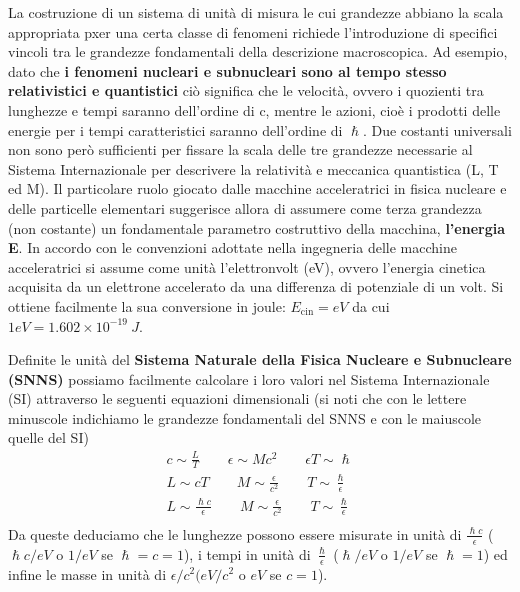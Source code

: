 La costruzione di un sistema di unità di misura le cui grandezze abbiano la scala appropriata pxer una certa classe di
fenomeni richiede l'introduzione di specifici vincoli tra le grandezze fondamentali della descrizione macroscopica.
Ad esempio, dato che \textbf{i fenomeni nucleari e subnucleari sono al tempo stesso relativistici e quantistici} ciò
significa che le velocità, ovvero i quozienti tra lunghezze e tempi saranno dell'ordine di c, mentre le azioni, cioè i
prodotti delle energie per i tempi caratteristici saranno dell'ordine di $\hslash$.
Due costanti universali non sono però sufficienti per fissare la scala delle tre grandezze necessarie al Sistema
Internazionale per descrivere la relatività e meccanica quantistica (L, T ed M).
Il particolare ruolo giocato dalle macchine acceleratrici in fisica nucleare e delle particelle elementari suggerisce
allora di assumere come terza grandezza (non costante) un fondamentale parametro costruttivo della macchina, \textbf{l'energia E}.
In accordo con le convenzioni adottate nella ingegneria delle macchine acceleratrici si assume come unità l'elettronvolt
(eV), ovvero l'energia cinetica acquisita da un elettrone accelerato da una differenza di potenziale di un volt.
Si ottiene facilmente la sua conversione in joule: $E_\text{cin} = eV$ da cui $1 eV = 1.602 \times 10^{-19} \ J$.

Definite le unità del \textbf{Sistema Naturale della Fisica Nucleare e Subnucleare (SNNS)} possiamo facilmente calcolare
i loro valori nel Sistema Internazionale (SI) attraverso le seguenti equazioni dimensionali (si noti che con le lettere
minuscole indichiamo le grandezze fondamentali del SNNS e con le maiuscole quelle del SI)
\begin{gather*}
    c \sim \frac{L}{T} \qquad \epsilon \sim M c^2 \qquad \epsilon T \sim \hslash\\
    L \sim cT \qquad M \sim \frac{\epsilon}{c^2} \qquad T \sim \frac{\hslash}{\epsilon} \\
     L \sim \frac{\hslash c}{\epsilon} \qquad M \sim \frac{\epsilon}{c^2} \qquad T \sim  \frac{\hslash}{\epsilon}\\
\end{gather*}
Da queste deduciamo che le lunghezze possono essere misurate in unità di $\frac{\hslash c}{\epsilon}$ ($\hslash c / eV$ o $1/eV$ se $\hslash=c=1$),
i tempi in unità di $\frac{\hslash}{\epsilon}$ ($\hslash/eV$ o $1/eV$ se $\hslash=1$) ed infine le masse in unità di $\epsilon/c^2(eV/c^2$ o $eV$ se $c=1$).

